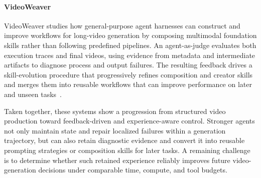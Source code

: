 \paragraph{VideoWeaver}
VideoWeaver studies how general-purpose agent harnesses can construct and improve workflows for long-video generation by composing multimodal foundation skills rather than following predefined pipelines. An agent-as-judge evaluates both execution traces and final videos, using evidence from metadata and intermediate artifacts to diagnose process and output failures. The resulting feedback drives a skill-evolution procedure that progressively refines composition and creator skills and merges them into reusable workflows that can improve performance on later and unseen tasks~\cite{avg260608091}.

Taken together, these systems show a progression from structured video production toward feedback-driven and experience-aware control. Stronger agents not only maintain state and repair localized failures within a generation trajectory, but can also retain diagnostic evidence and convert it into reusable prompting strategies or composition skills for later tasks. A remaining challenge is to determine whether such retained experience reliably improves future video-generation decisions under comparable time, compute, and tool budgets.

\FloatBarrier
